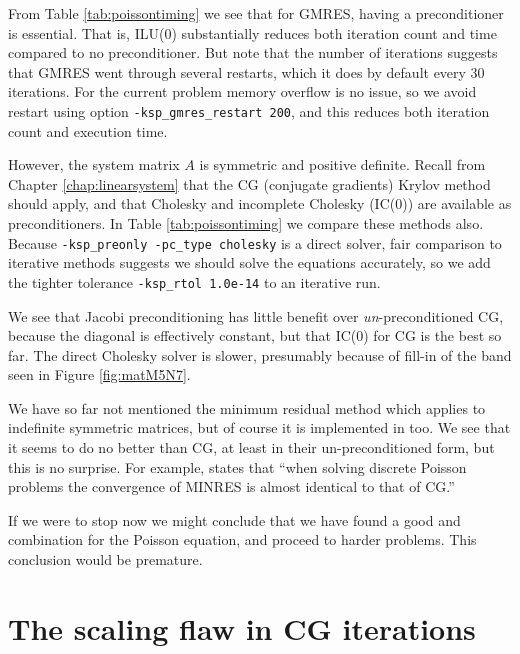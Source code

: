 From Table \ref{tab:poissontiming} we see that for GMRES, having a preconditioner is essential.  That is, ILU($0$) substantially reduces both iteration count and time compared to no preconditioner.  But note that the number of iterations suggests that GMRES went through several restarts, which it does by default every 30 iterations.  For the current problem memory overflow is no issue, so we avoid restart using option \texttt{-ksp\_gmres\_restart 200}, and this reduces both iteration count and execution time.

However, the system matrix $A$ is symmetric and positive definite.  Recall from Chapter \ref{chap:linearsystem} that the CG (conjugate gradients) Krylov method should apply, and that Cholesky and incomplete Cholesky (IC($0$)) are available as preconditioners.  In Table \ref{tab:poissontiming} we compare these methods also.  Because \texttt{-ksp\_preonly -pc\_type cholesky} is a direct solver, fair comparison to iterative methods suggests we should solve the equations accurately, so we add the tighter tolerance \texttt{-ksp\_rtol 1.0e-14} to an iterative run.

We see that Jacobi preconditioning has little benefit over \emph{un}-preconditioned CG, because the diagonal is effectively constant, but that IC($0$) for CG is the best so far.  The direct Cholesky solver is slower, presumably because of fill-in of the band seen in Figure \ref{fig:matM5N7}.

We have so far not mentioned the minimum residual method \citep[MINRES]{Greenbaum1997} which applies to indefinite symmetric matrices, but of course it is implemented in \PETSc too.  We see that it seems to do no better than CG, at least in their un-preconditioned form, but this is no surprise.  For example, \citet[][p.~88]{Elmanetal2005} states that ``when solving discrete Poisson problems the convergence of MINRES is almost identical to that of CG.''

If we were to stop now we might conclude that we have found a good \pKSP and \pPC combination for the Poisson equation, and proceed to harder problems.  This conclusion would be premature.


\section{The scaling flaw in CG iterations}

